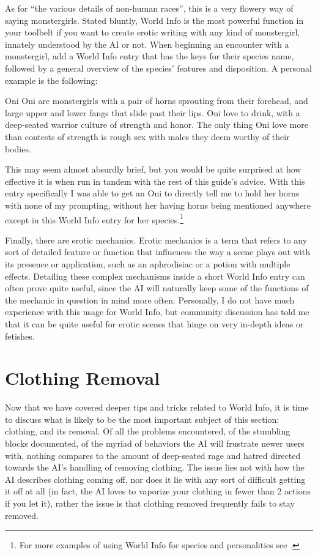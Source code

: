 \documentclass[Source-main.tex]{subfiles}
\begin{document}
As for “the various details of non-human races”, this is a very flowery way of saying monstergirls.
Stated bluntly, World Info is the most powerful function in your toolbelt if you want to create erotic writing with any kind of monstergirl, innately understood by the AI or not.
When beginning an encounter with a monstergirl, add a World Info entry that has the keys for their species name, followed by a general overview of the species’ features and disposition.
A personal example is the following:

\begin{WIbox}{Oni}
Oni are monstergirls with a pair of horns sprouting from their forehead, and large upper and lower fangs that slide past their lips.
Oni love to drink, with a deep-seated warrior culture of strength and honor.
The only thing Oni love more than contests of strength is rough sex with males they deem worthy of their bodies.
\end{WIbox}
This may seem almost absurdly brief, but you would be quite surprised at how effective it is when run in tandem with the rest of this guide’s advice.
With this entry specifically I was able to get an Oni to directly tell me to hold her horns with none of my prompting, without her having horns being mentioned anywhere except in this World Info entry for her species.\footnote{For more examples of using World Info for species and personalities see .}

Finally, there are erotic mechanics.
Erotic mechanics is a term that refers to any sort of detailed feature or function that influences the way a scene plays out with its presence or application, such as an aphrodisiac or a potion with multiple effects.
Detailing these complex mechanisms inside a short World Info entry can often prove quite useful, since the AI will naturally keep some of the functions of the mechanic in question in mind more often.
Personally, I do not have much experience with this usage for World Info, but community discussion has told me that it can be quite useful for erotic scenes that hinge on very in-depth ideas or fetishes.

\section{Clothing Removal}

Now that we have covered deeper tips and tricks related to World Info, it is time to discuss what is likely to be the most important subject of this section: clothing, and its removal.
Of all the problems encountered, of the stumbling blocks documented, of the myriad of behaviors the AI will frustrate newer users with, nothing compares to the amount of deep-seated rage and hatred directed towards the AI’s handling of removing clothing.
The issue lies not with how the AI describes clothing coming off, nor does it lie with any sort of difficult getting it off at all (in fact, the AI loves to vaporize your clothing in fewer than 2 actions if you let it), rather the issue is that clothing removed frequently fails to stay removed.
\end{document}

